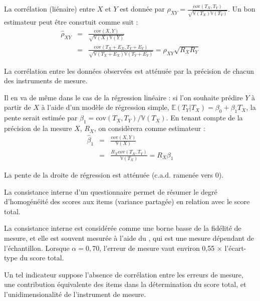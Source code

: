 La corrélation (liénaire) entre $X$ et $Y$ est donnée par
$\rho_{XY}=\frac{\text{cov}(T_X,T_Y)}{\sqrt{\mathbb{V}(T_X)\mathbb{V}(T_Y)}}$.
Un bon estimateur peut être consrtuit comme suit :
\begin{eqnarray}\label{eq:corr}
	\hat\rho_{XY} & = & \frac{\text{cov}(X,Y)}{\sqrt{\mathbb{V}(X)\mathbb{V}(Y)}}\nonumber\\
	              & = &
                      \frac{\text{cov}(T_X+E_X,T_Y+E_Y)}{\sqrt{\mathbb{V}(T_X+E_X)\mathbb{V}(T_Y+E_Y)}}
                  =\rho_{XY}\sqrt{R_XR_Y}
\end{eqnarray}

La corrélation entre les données observées est atténuée par la précision de
chacun des instruments de mesure.

\foilhead{}
Il en va de même dans le cas de la régression linéaire : si l'on souhaite
prédire $Y$ à partir de $X$ à l'aide d'un modèle de régression simple,
$\mathbb{E}(T_Y|T_X)=\beta_0+\beta_1T_X$, la pente serait estimée par
$\beta_1=\text{cov}(T_X,T_Y)/\mathbb{V}(T_X)$. En tenant compte de la précision de
la mesure $X$, $R_X$, on considèrera comme estimateur :
\begin{eqnarray}\label{eq:slope}
	\hat\beta_1 & = & \frac{\text{cov}(X,Y)}{\mathbb{V}(X)}\nonumber\\          
              & = & \frac{R_X\text{cov}(T_X,T_Y)}{\mathbb{V}(T_X)}=R_X\beta_1
\end{eqnarray}

La pente de la droite de régression est atténuée (c.a.d. ramenée vers 0).


La consistance interne d'un questionnaire permet de résumer le degré
d'homogénéité des scores aux items (variance partagée) en relation avec le score
total.

La consistance interne est considérée comme une borne basse de la fidélité de
mesure, et elle est souvent mesurée à l'aide du , qui est une mesure dépendant de l'échantillon. Lorsque $\alpha =
0,70$, l'erreur de mesure vaut environ 0,55 $\times$ l'écart-type du score
total.

Un tel indicateur suppose l'absence de corrélation entre les erreurs de mesure,
une contribution équivalente des items dans la détermination du score total, et
l'unidimensionalité de l'instrument de mesure.

